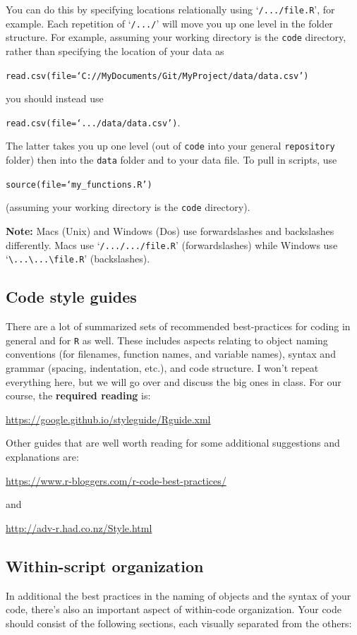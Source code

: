 \documentclass[12pt,letterpaper]{article}
\begin{document}
You can do this by specifying locations relationally using `\texttt{/.../file.R}', for example. Each repetition of `\texttt{/.../}' will move you up one level in the folder structure.   For example, assuming your working directory is the \texttt{code} directory, rather than specifying the location of your data as

\texttt{read.csv(file=`C://MyDocuments/Git/MyProject/data/data.csv')}

you should instead use

\texttt{read.csv(file=`.../data/data.csv')}.

The latter takes you up one level (out of \texttt{code} into your general \texttt{repository} folder) then into the \texttt{data} folder and to your data file.  To pull in scripts, use 

\texttt{source(file=`my\_functions.R')}

(assuming your working directory is the \texttt{code} directory).

\textbf{Note:} Macs (Unix) and Windows (Dos) use forwardslashes and backslashes differently.  Macs use `\texttt{/.../.../file.R}' (forwardslashes) while Windows use `\texttt{\textbackslash...\textbackslash...\textbackslash file.R}' (backslashes).


\subsection{Code style guides} \label{codestyleguide}
There are a lot of summarized sets of recommended best-practices for coding in general and for \texttt{R} as well.  These includes aspects relating to object naming conventions (for filenames, function names, and variable names), syntax and grammar (spacing, indentation, etc.), and code structure.  I won't repeat everything here, but we will go over and discuss the big ones in class.  For our course, the \textbf{required reading} is:

\url{https://google.github.io/styleguide/Rguide.xml}

Other guides that are well worth reading for some additional suggestions and explanations are:

\url{https://www.r-bloggers.com/r-code-best-practices/}

and 

\url{http://adv-r.had.co.nz/Style.html}


\subsection{Within-script organization}
In additional the best practices in the naming of objects and the syntax of your code, there's also an important aspect of within-code organization. Your code should consist of the following sections, each visually separated from the others:
\end{document}
